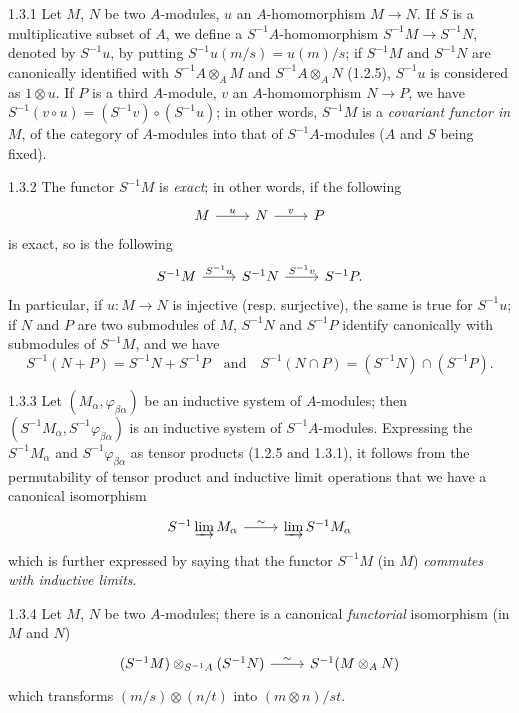 \documentclass[../main.tex]{subfiles}
\begin{document}
\begin{cx}{1.3.1}
Let $M$, $N$ be two $A$-modules, $u$ an $A$-homomorphism $M\to N$. If $S$ is a multiplicative subset of $A$,
we define a $S^{-1}A$-homomorphism $S^{-1}M\to S^{-1}N$, denoted by $S^{-1}u$, by putting
$S^{-1}u(m/s)=u(m)/s$; if $S^{-1}M$ and $S^{-1}N$ are canonically identified with $S^{-1}A\otimes_A M$ and
$S^{-1}A\otimes_A N$ (1.2.5), $S^{-1}u$ is considered as $1\otimes u$. If $P$ is a third $A$-module,
$v$ an $A$-homomorphism $N\to P$, we have $S^{-1}(v\circ u)=(S^{-1}v)\circ(S^{-1}u)$; in other words,
$S^{-1}M$ is a \emph{covariant functor in} $M$, of the category of $A$-modules into that of $S^{-1}A$-modules
($A$ and $S$ being fixed).
\end{cx}

\begin{cx}{1.3.2}
The functor $S^{-1}M$ is \emph{exact}; in other words, if the following
\[\begin{tikzcd}
  M\ar[r,"u"] & N\ar[r,"v"] & P
\end{tikzcd}\]
is exact, so is the following
\[\begin{tikzcd}
  S^{-1}M\ar[r,"S^{-1}u"] & S^{-1}N\ar[r,"S^{-1}v"] & S^{-1}P.
\end{tikzcd}\]
In particular, if $u:M\to N$ is injective (resp. surjective), the same is true for $S^{-1}u$;
 if $N$ and $P$ are two
submodules of $M$, $S^{-1}N$ and $S^{-1}P$ identify canonically with submodules of $S^{-1}M$, and we have
\[
  S^{-1}(N+P)=S^{-1}N+S^{-1}P\quad\text{and}\quad S^{-1}(N\cap P)=(S^{-1}N)\cap(S^{-1}P).
\]
\end{cx}

\begin{cx}{1.3.3}
Let $(M_\alpha,\varphi_{\beta\alpha})$ be an inductive system of $A$-modules; then
$(S^{-1}M_\alpha,S^{-1}\varphi_{\beta\alpha})$ is an inductive system of $S^{-1}A$-modules.
Expressing the $S^{-1}M_\alpha$ and $S^{-1}\varphi_{\beta\alpha}$ as tensor products (1.2.5 and 1.3.1),
it follows from the permutability of tensor product and inductive limit operations that we have a canonical isomorphism
\[\begin{tikzcd}
  S^{-1}\varinjlim M_\alpha\ar[r,"\sim"] &\varinjlim S^{-1} M_\alpha
\end{tikzcd}\]
which is further expressed by saying that the functor $S^{-1}M$ (in $M$) \emph{commutes with inductive limits}.
\end{cx}

\begin{cx}{1.3.4}
Let $M$, $N$ be two $A$-modules; there is a canonical \emph{functorial} isomorphism (in $M$ and $N$)
\[\begin{tikzcd}
  (S^{-1}M)\otimes_{S^{-1}A}(S^{-1}N)\ar[r,"\sim"] &S^{-1}(M\otimes_A N)
\end{tikzcd}\]
which transforms $(m/s)\otimes(n/t)$ into $(m\otimes n)/st$.
\end{cx}
\end{document}
